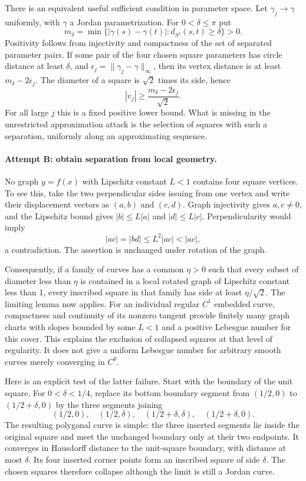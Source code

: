 \documentclass[11pt]{article}
\begin{document}
There is an equivalent useful sufficient condition in parameter space.
Let $\gamma_j\to\gamma$ uniformly, with $\gamma$ a Jordan parametrization.
For $0<\delta\le\pi$ put
\[
 m_\delta=\min\{|\gamma(s)-\gamma(t)|:
                   d_{S^1}(s,t)\ge\delta\}>0.
\]
Positivity follows from injectivity and compactness of the set of separated
parameter pairs. If some pair of the four chosen square parameters has
circle distance at least $\delta$, and
$\epsilon_j=\|\gamma_j-\gamma\|_\infty$, then its vertex distance is
at least $m_\delta-2\epsilon_j$. The diameter of a square is $\sqrt2$
times its side, hence
\begin{equation}\label{a489:noncollapse}
                 |v_j|\ge\frac{m_\delta-2\epsilon_j}{\sqrt2}.
\end{equation}
For all large $j$ this is a fixed positive lower bound. What is missing
in the unrestricted approximation attack is the selection of squares with
such a separation, uniformly along an approximating sequence.

\paragraph{Attempt B: obtain separation from local geometry.}
No graph $y=f(x)$ with Lipschitz constant $L<1$ contains four square
vertices. To see this, take the two perpendicular sides issuing from one
vertex and write their displacement vectors as $(a,b)$ and $(c,d)$.
Graph injectivity gives $a,c\ne0$, and the Lipschitz bound gives
$|b|\le L|a|$ and $|d|\le L|c|$. Perpendicularity would imply
\[
                     |ac|=|bd|\le L^2|ac|<|ac|,
\]
a contradiction. The assertion is unchanged under rotation of the graph.

Consequently, if a family of curves has a common $\eta>0$ such that
every subset of diameter less than $\eta$ is contained in a local
rotated graph of Lipschitz constant less than 1, every inscribed square
in that family has side at least $\eta/\sqrt2$. The limiting lemma now
applies. For an individual regular $C^1$ embedded curve, compactness and
continuity of its nonzero tangent provide finitely many graph charts with
slopes bounded by some $L<1$ and a positive Lebesgue number for this cover.
This explains the exclusion of collapsed squares at that level of
regularity. It does not give a uniform Lebesgue number for arbitrary smooth
curves merely converging in $C^0$.

Here is an explicit test of the latter failure. Start with the boundary
of the unit square. For $0<\delta<1/4$, replace its bottom boundary segment
from $(1/2,0)$ to $(1/2+\delta,0)$ by the three segments joining
\[
 (1/2,0),\quad(1/2,\delta),\quad
 (1/2+\delta,\delta),\quad(1/2+\delta,0).
\]
The resulting polygonal curve is simple: the three inserted segments lie
inside the original square and meet the unchanged boundary only at their
two endpoints. It converges in Hausdorff distance to the unit-square
boundary, with distance at most $\delta$. Its four inserted corner points
form an inscribed square of side $\delta$. The chosen squares therefore
collapse although the limit is still a Jordan curve.
\end{document}

